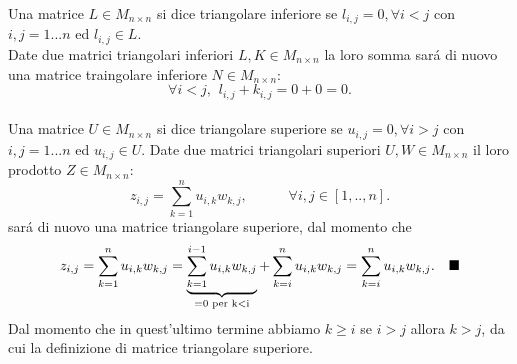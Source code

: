 Una matrice \( L \in M_{n \times n} \) si dice triangolare inferiore se \( l_{i,j}=0, \forall i<j \) con \(i,j = 1...n \) ed \( l_{i,j} \in L \).
\\
Date due matrici triangolari inferiori \( L,K \in M_{n \times n} \) la loro somma sar\'a di nuovo una matrice traingolare inferiore \( N \in M_{n \times n} \):
\[
 \forall i<j, \hspace{5pt} l_{i,j} + k_{i,j} = 0 + 0 = 0.
\]
\\
Una matrice \( U \in M_{n \times n} \) si dice triangolare superiore se \( u_{i,j}=0, \forall i>j \) con \(i,j = 1...n \) ed \( u_{i,j} \in U \).
Date due matrici triangolari superiori  \( U,W \in M_{n \times n} \)  il loro prodotto  \( Z \in M_{n \times n} \):
\[
z_{i,j} = \sum_{k=1}^n u_{i,k} w_{k,j}, \hspace{35pt} \forall i,j \in [1,..,n].
\]
sar\'a di nuovo una matrice triangolare superiore, dal momento che
\[
z_{i,j} =  \sum_{k=1}^n u_{i,k} w_{k,j} =  \underbrace{ \sum_{k=1}^{i-1} u_{i,k} w_{k,j} }_\text{=0 per k<i}  + \sum_{k=i}^n u_{i,k} w_{k,j} = \sum_{k=i}^n u_{i,k} w_{k,j}. \hspace{1em}\blacksquare
\]
Dal momento che in quest'ultimo termine abbiamo \( k \geq i \) se \( i>j \) allora \( k>j \), da cui la definizione di matrice triangolare superiore.
